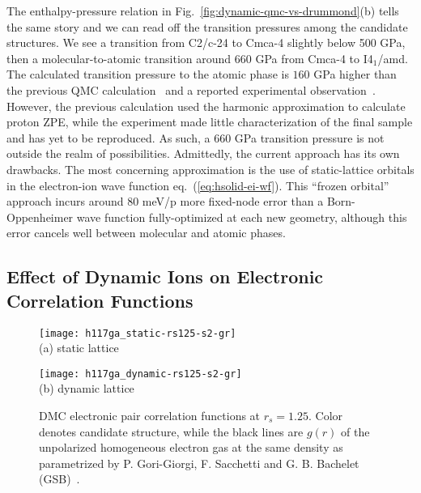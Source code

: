 The enthalpy-pressure relation in Fig.~\ref{fig:dynamic-qmc-vs-drummond}(b) tells the same story and we can read off the transition pressures among the candidate structures.
We see a transition from C2/c-24 to Cmca-4 slightly below 500 GPa, then a molecular-to-atomic transition around 660 GPa from Cmca-4 to I4$_1$/amd.
The calculated transition pressure to the atomic phase is $160$ GPa higher than the previous QMC calculation~\cite{McMinis2015} and a reported experimental observation~\cite{Silvera2017}.
However, the previous calculation used the harmonic approximation to calculate proton ZPE, while the experiment made little characterization of the final sample and has yet to be reproduced.
As such, a $660$ GPa transition pressure is not outside the realm of possibilities.
Admittedly, the current approach has its own drawbacks.
The most concerning approximation is the use of static-lattice orbitals in the electron-ion wave function eq.~(\ref{eq:hsolid-ei-wf}).
This ``frozen orbital'' approach incurs around $80$ meV/p more fixed-node error than a Born-Oppenheimer wave function fully-optimized at each new geometry, although this error cancels well between molecular and atomic phases.

\subsection{Effect of Dynamic Ions on Electronic Correlation Functions}

\begin{figure}[h]
\centering
\begin{minipage}{0.49\textwidth}
\centering
\texttt{[image: h117ga\_static-rs125-s2-gr]}\\
(a) static lattice
\end{minipage}
\begin{minipage}{0.49\textwidth}
\centering
\texttt{[image: h117ga\_dynamic-rs125-s2-gr]}\\
(b) dynamic lattice %
\end{minipage}
\caption{DMC electronic pair correlation functions at $r_s=1.25$. Color denotes candidate structure, while the black lines are $g(r)$ of the unpolarized homogeneous electron gas at the same density as parametrized by P. Gori-Giorgi, F. Sacchetti and G. B. Bachelet (GSB)~\cite{Gori-Giorgi2000}.}
\label{fig:hsolid-eegr}
\end{figure}

